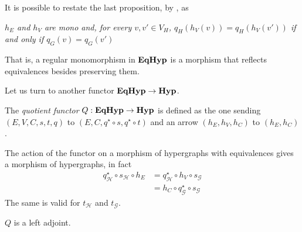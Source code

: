 \begin{remark}
    It is possible to restate the last proposition, by , as 
    \begin{displayquote}
    \textit{$h_E$ and $h_V$ are mono and, for every $v, v'\in V_H$, $q_H(h_V(v))=q_H(h_V(v'))$ if and only if $q_G(v)=q_G(v')$}
    \end{displayquote}
    That is, a regular monomorphism in $\textbf{\textup{EqHyp}}$ is a morphism that reflects equivalences besides preserving them.
\end{remark}

Let us turn to another functor $\textbf{\textup{EqHyp}} \to \textbf{\textup{Hyp}}$.

\begin{definition}
The \emph{quotient functor} $Q:\textbf{\textup{EqHyp}}\to \textbf{\textup{Hyp}} $ is defined as
the one sending $(E, V, C, s, t, q)$ to $(E, C, q^{\star}\circ s, q^{\star}\circ t)$ and an arrow $(h_E, h_V, h_C)$ to $(h_E, h_C)$.
\end{definition}

\begin{remark}
	The action of the functor on a morphism of hypergraphs with equivalences gives a morphism of hypergraphs,
	in fact 
	\begin{align*}
		q^{\star}_\mathcal{H} \circ s_\mathcal{H} \circ h_E &= q^{\star}_\mathcal{H} \circ h_V \circ s_\mathcal{G}\\ &= h_C \circ q^{\star}_\mathcal{G} \circ s_\mathcal{G}
	\end{align*}
	The same is valid for $t_\mathcal{H}$ and $t_\mathcal{G}$. 
\end{remark}

\begin{lemma}\label{lemma:quot_funct_left_adj}
    $Q$ is a left adjoint.
\end{lemma}


